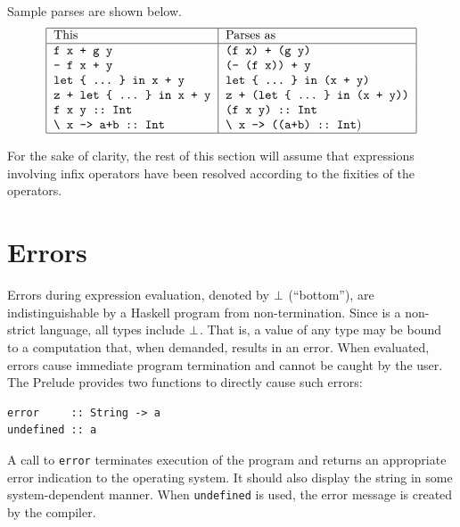 
Sample parses are shown below.
\[\bt{|l|l|}%
\hline
This                                & Parses as                             \\
\hline
\mbox{\tt f\ x\ +\ g\ y}                         & \mbox{\tt (f\ x)\ +\ (g\ y)}                       \\
\mbox{\tt -\ f\ x\ +\ y}                         & \mbox{\tt (-\ (f\ x))\ +\ y}                       \\
\mbox{\tt let\ {\char'173}\ ...\ {\char'175}\ in\ x\ +\ y}              & \mbox{\tt let\ {\char'173}\ ...\ {\char'175}\ in\ (x\ +\ y)}              \\
\mbox{\tt z\ +\ let\ {\char'173}\ ...\ {\char'175}\ in\ x\ +\ y}          & \mbox{\tt z\ +\ (let\ {\char'173}\ ...\ {\char'175}\ in\ (x\ +\ y))}        \\
\mbox{\tt f\ x\ y\ ::\ Int}                      & \mbox{\tt (f\ x\ y)\ ::\ Int}                      \\
\mbox{\tt {\char'134}\ x\ ->\ a+b\ ::\ Int}                 & \mbox{\tt {\char'134}\ x\ ->\ ((a+b)\ ::\ Int})               \\
\hline\et\]

For the sake of clarity, the rest of this section will assume that
expressions involving infix operators have been resolved according to
the fixities of the operators.

\section{Errors}
\label{basic-errors}
Errors during expression evaluation, denoted by \mbox{$\it \bot$}\index{\mbox{$\it \bot$}} (``bottom''),
are indistinguishable by a Haskell program from non-termination.  Since \Haskell{} is a
non-strict language, all \Haskell{} types include \mbox{$\it \bot$}.  That is, a value
of any type may be bound to a computation that, when demanded, results
in an error.  When evaluated, errors cause immediate program
termination and cannot be caught by the user.  The Prelude provides
two functions to directly 
cause such errors:
\bprog
{\small\begin{verbatim}
error     :: String -> a
undefined :: a
\end{verbatim}}
\eprog
{}
A call to \mbox{\tt error} terminates execution of
the program and returns an appropriate error indication to the
operating system.  It should also display the string in some
system-dependent manner.  When \mbox{\tt undefined} is used, the error message
is created by the compiler.

